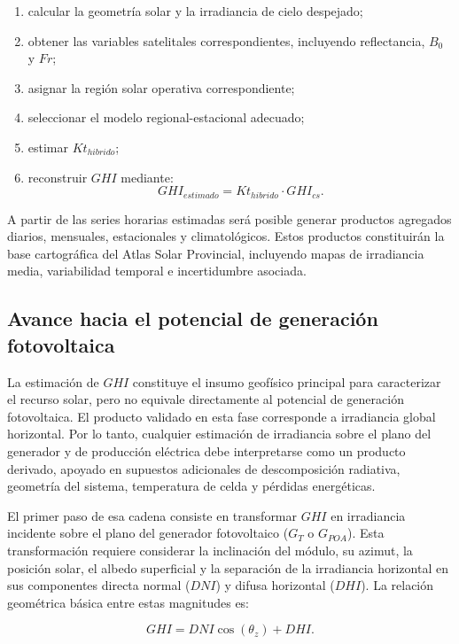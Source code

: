 \documentclass[../main.tex]{subfiles}
\begin{document}
\begin{enumerate}
    \item calcular la geometría solar y la irradiancia de cielo despejado;
    \item obtener las variables satelitales correspondientes, incluyendo reflectancia, $B_0$ y $Fr$;
    \item asignar la región solar operativa correspondiente;
    \item seleccionar el modelo regional-estacional adecuado;
    \item estimar $Kt_{hibrido}$;
    \item reconstruir $GHI$ mediante:
    \begin{equation}
    GHI_{estimado} = Kt_{hibrido} \cdot GHI_{cs}.
    \end{equation}
\end{enumerate}

A partir de las series horarias estimadas será posible generar productos agregados diarios, mensuales, estacionales y climatológicos. Estos productos constituirán la base cartográfica del Atlas Solar Provincial, incluyendo mapas de irradiancia media, variabilidad temporal e incertidumbre asociada.

\subsection{Avance hacia el potencial de generación fotovoltaica}

La estimación de $GHI$ constituye el insumo geofísico principal para caracterizar el recurso solar, pero no equivale directamente al potencial de generación fotovoltaica. El producto validado en esta fase corresponde a irradiancia global horizontal. Por lo tanto, cualquier estimación de irradiancia sobre el plano del generador y de producción eléctrica debe interpretarse como un producto derivado, apoyado en supuestos adicionales de descomposición radiativa, geometría del sistema, temperatura de celda y pérdidas energéticas.

El primer paso de esa cadena consiste en transformar $GHI$ en irradiancia incidente sobre el plano del generador fotovoltaico ($G_T$ o $G_{POA}$). Esta transformación requiere considerar la inclinación del módulo, su azimut, la posición solar, el albedo superficial y la separación de la irradiancia horizontal en sus componentes directa normal ($DNI$) y difusa horizontal ($DHI$). La relación geométrica básica entre estas magnitudes es:

\begin{equation}
GHI = DNI \cos(\theta_z) + DHI.
\end{equation}
\end{document}
